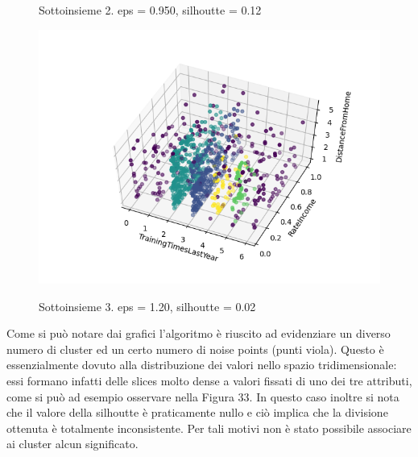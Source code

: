 \documentclass[a4paper,9pt]{article}
\begin{document}
\begin{figure}[H]
\begin{minipage}[b]{0.45\textwidth}
\caption{Sottoinsieme 2. eps = 0.950, silhoutte = 0.12 }
\label{etichetta2}
\centering
\includegraphics[width=\textwidth]{5 (2).png}
\caption{Sottoinsieme 3. eps = 1.20, silhoutte = 0.02}
\label{etichetta2}
\end{minipage}
\end{figure}

Come si può notare dai grafici l'algoritmo è riuscito ad evidenziare un diverso numero di cluster ed un certo numero di noise points (punti viola). Questo è essenzialmente dovuto alla distribuzione dei valori nello spazio tridimensionale: essi formano infatti delle slices molto dense a valori fissati di uno dei tre attributi, come si può ad esempio osservare nella Figura 33. In questo caso inoltre si nota che il valore della silhoutte è praticamente nullo e ciò implica che la divisione ottenuta è totalmente inconsistente. Per tali motivi non è stato possibile associare ai cluster alcun significato.
\end{document}
